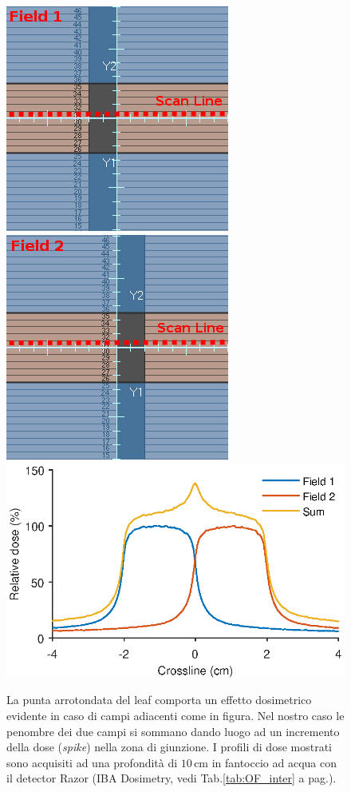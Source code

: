 \begin{figure}
\centering
\includegraphics[width=.35\textwidth]{./cap2/tip5.png}
\includegraphics[width=.35\textwidth]{./cap2/tip6.png}\\\vspace{.3cm}
\includegraphics[width=.7\textwidth]{./cap2/MLC_Plots/Abutted/abutted_m.eps}
\caption{La punta arrotondata del leaf comporta un effetto dosimetrico evidente in caso di campi adiacenti come in figura. Nel nostro caso le penombre dei due campi si sommano dando luogo ad un incremento della dose (\textit{spike}) nella zona di giunzione. I profili di dose mostrati sono acquisiti ad una profondità di $10\,$cm in fantoccio ad acqua con il detector Razor (IBA Dosimetry, vedi Tab.\ref{tab:OF_inter} a pag.\pageref{tab:OF_inter}).}
\label{fig:MLC_tip_effect}
\end{figure}


